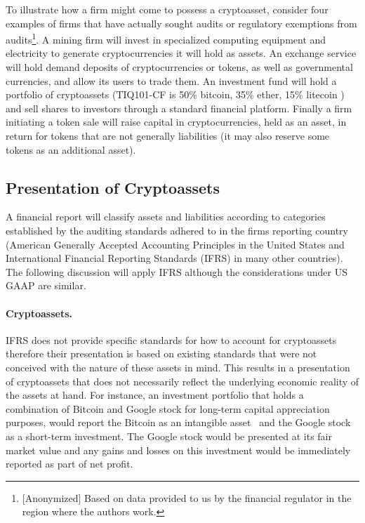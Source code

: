 To illustrate how a firm might come to possess a cryptoasset, consider four examples of firms that have actually sought audits or regulatory exemptions from audits\footnote{[Anonymized] Based on data provided to us by the financial regulator in the region where the authors work.}. A mining firm will invest in specialized computing equipment and electricity to generate cryptocurrencies it will hold as assets. An exchange service will hold demand deposits of cryptocurrencies or tokens, as well as governmental currencies, and allow its users to trade them. An investment fund will hold a portfolio of cryptoassets (\eg TIQ101-CF is 50\% bitcoin, 35\% ether, 15\% litecoin ) and sell shares to investors through a standard financial platform. Finally a firm initiating a token sale will raise capital in cryptocurrencies, held as an asset, in return for tokens that are not generally liabilities (it may also reserve some tokens as an additional asset).


\subsection{Presentation of Cryptoassets}
A financial report will classify assets and liabilities according to categories established by the auditing standards adhered to in the firm\textquotesingle s reporting country (American Generally Accepted Accounting Principles in the United States and International Financial Reporting Standards (IFRS) in many other countries). The following discussion will apply IFRS although the considerations under US GAAP are similar. 


\paragraph{Cryptoassets.} IFRS does not provide specific standards for how to account for cryptoassets therefore their presentation is based on existing standards that were not conceived with the nature of these assets in mind. This results in a presentation of cryptoassets that does not necessarily reflect the underlying economic reality of the assets at hand. For instance, an investment portfolio that holds a combination of Bitcoin and Google stock for long-term capital appreciation purposes, would report the Bitcoin as an intangible asset~\cite{RCGTIFRsCrypto2018} and the Google stock as a short-term investment. The Google stock would be presented at its fair market value and any gains and losses on this investment would be immediately reported as part of net profit. 


